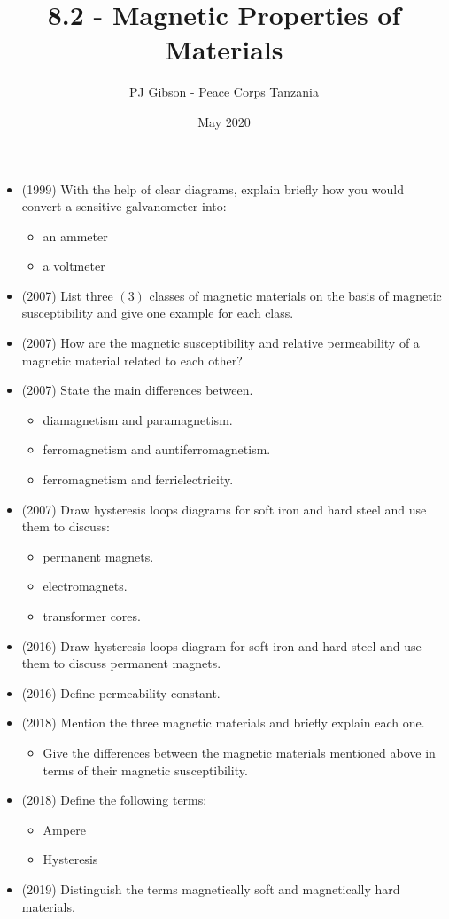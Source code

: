 \documentclass{article}
\title{\textbf{8.2 - Magnetic Properties of Materials}}
\author{PJ Gibson - Peace Corps Tanzania}
\date{May 2020}
\begin{document}
\maketitle

\begin{itemize}
\item (1999)  With the help of clear diagrams, explain briefly how you would convert a sensitive galvanometer into:
 \begin{itemize}
\item an ammeter
\item a voltmeter
\end{itemize}
\item (2007)  List three $ (3)$ classes of magnetic materials on the basis of magnetic susceptibility and give one example for each class.
\item (2007)  How are the magnetic susceptibility and relative permeability of a magnetic material related to each other?
\item (2007)  State the main differences between.
 \begin{itemize}
\item diamagnetism and paramagnetism. 
\item ferromagnetism and auntiferromagnetism. 
\item ferromagnetism and ferrielectricity. 
\end{itemize}
\item (2007)  Draw hysteresis loops diagrams for soft iron and hard steel and use them to discuss:
 \begin{itemize}
\item permanent magnets.
\item electromagnets.
\item transformer cores. 
\end{itemize}
\item (2016)  Draw hysteresis loops diagram for soft iron and hard steel and use them to discuss permanent magnets.
\item (2016)  Define permeability constant.
\item (2018)  Mention the three magnetic materials and briefly explain each one. 
 \begin{itemize}
\item Give the differences between the magnetic materials mentioned above in terms of their magnetic susceptibility. 
\end{itemize}
\item (2018)  Define the following terms:
 \begin{itemize}
\item Ampere 
\item Hysteresis 
\end{itemize}
\item (2019)  Distinguish the terms magnetically soft and magnetically hard materials.
\end{itemize}
\end{document}
